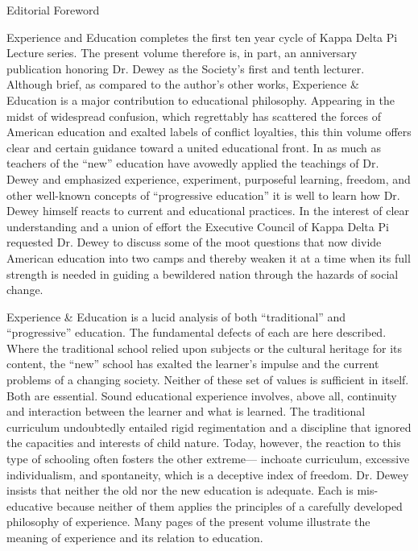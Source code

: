 Editorial Foreword 

Experience and Education completes the first ten year cycle of Kappa Delta Pi 
Lecture series. The present volume therefore is, in part, an anniversary publication 
honoring Dr. Dewey as the Society’s first and tenth lecturer. Although brief, as compared 
to the author’s other works, Experience & Education is a major contribution to 
educational philosophy. Appearing in the midst of widespread confusion, which 
regrettably has scattered the forces of American education and exalted labels of conflict 
loyalties, this thin volume offers clear and certain guidance toward a united educational 
front. In as much as teachers of the “new” education have avowedly applied the teachings 
of Dr. Dewey and emphasized experience, experiment, purposeful learning, freedom, and 
other well-known concepts of “progressive education” it is well to learn how Dr. Dewey 
himself reacts to current and educational practices. In the interest of clear understanding 
and a union of effort the Executive Council of Kappa Delta Pi requested Dr. Dewey to 
discuss some of the moot questions that now divide American education into two camps 
and thereby weaken it at a time when its full strength is needed in guiding a bewildered 
nation through the hazards of social change. 


Experience & Education is a lucid analysis of both “traditional” and “progressive” 
education. The fundamental defects of each are here described. Where the traditional 
school relied upon subjects or the cultural heritage for its content, the “new” school has 
exalted the learner’s impulse and the current problems of a changing society. Neither of 
these set of values is sufficient in itself. Both are essential. Sound educational experience 
involves, above all, continuity and interaction between the learner and what is learned. 
The traditional curriculum undoubtedly entailed rigid regimentation and a discipline that 
ignored the capacities and interests of child nature. Today, however, the reaction to this 
type of schooling often fosters the other extreme— inchoate curriculum, excessive 
individualism, and spontaneity, which is a deceptive index of freedom. Dr. Dewey insists 
that neither the old nor the new education is adequate. Each is mis-educative because 
neither of them applies the principles of a carefully developed philosophy of experience. 
Many pages of the present volume illustrate the meaning of experience and its relation to 
education. 

